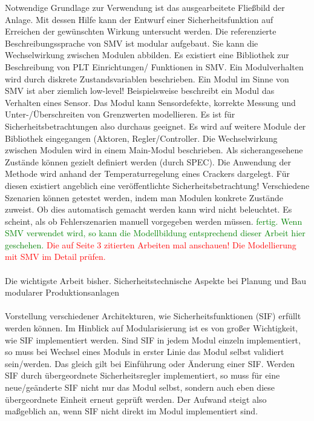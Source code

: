 Notwendige Grundlage zur Verwendung ist das ausgearbeitete Flie\ss{}bild der Anlage. Mit dessen Hilfe kann der Entwurf einer Sicherheitsfunktion auf Erreichen der gew\"unschten Wirkung untersucht werden. Die referenzierte Beschreibungssprache von SMV ist modular aufgebaut. Sie kann die Wechselwirkung zwischen Modulen abbilden. Es existiert eine Bibliothek zur Beschreibung von PLT Einrichtungen/ Funktionen in SMV. Ein Modulverhalten wird durch diskrete Zustandsvariablen beschrieben. Ein Modul im Sinne von SMV ist aber ziemlich low-level! Beispielsweise beschreibt ein Modul das Verhalten eines Sensor. Das Modul kann Sensordefekte, korrekte Messung und Unter-/\"Uberschreiten von Grenzwerten modellieren. Es ist f\"ur Sicherheitsbetrachtungen also durchaus geeignet. Es wird auf weitere Module der Bibliothek eingegangen (Aktoren, Regler/Controller. Die Wechselwirkung zwischen Modulen wird in einem Main-Modul beschrieben. Als \glqq sicher\grqq { }angesehene Zust\"ande k\"onnen gezielt definiert werden (durch SPEC). Die Anwendung der Methode wird anhand der Temperaturregelung eines Crackers dargelegt. F\"ur diesen existiert angeblich eine ver\"offentlichte Sicherheitsbetrachtung! Verschiedene Szenarien k\"onnen getestet werden, indem man Modulen konkrete Zust\"ande zuweist. Ob dies automatisch gemacht werden kann wird nicht beleuchtet. Es scheint, als ob Fehlerszenarien manuell vorgegeben werden m\"ussen.  \hfill \newline
\textcolor{green}{fertig. Wenn SMV verwendet wird, so kann die Modellbildung entsprechend dieser Arbeit hier geschehen.}
\textcolor{red}{Die auf Seite 3 zitierten Arbeiten mal anschauen! Die Modellierung mit SMV im Detail pr\"ufen. }

\paragraph*{\cite{Fleischer_2015}} Die wichtigste Arbeit bisher. \hfill \newline Sicherheitstechnische Aspekte bei Planung und Bau modularer Produktionsanlagen

\paragraph*{\cite{Pfeffer_2015}} Vorstellung verschiedener Architekturen, wie Sicherheitsfunktionen (SIF) erf\"ullt werden k\"onnen. Im Hinblick auf Modularisierung ist es von gro\ss{}er Wichtigkeit, wie SIF implementiert werden. Sind SIF in jedem Modul einzeln implementiert, so muss bei Wechsel eines Moduls in erster Linie das Modul selbst validiert sein/werden. Das gleich gilt bei Einf\"uhrung oder \"Anderung einer SIF. Werden SIF durch \"ubergeordnete Sicherheitsregler implementiert, so muss f\"ur eine neue/ge\"anderte SIF nicht nur das Modul selbst, sondern auch eben diese \"ubergeordnete Einheit erneut gepr\"uft werden. Der Aufwand steigt also ma\ss{}geblich an, wenn SIF nicht direkt im Modul implementiert sind.   

